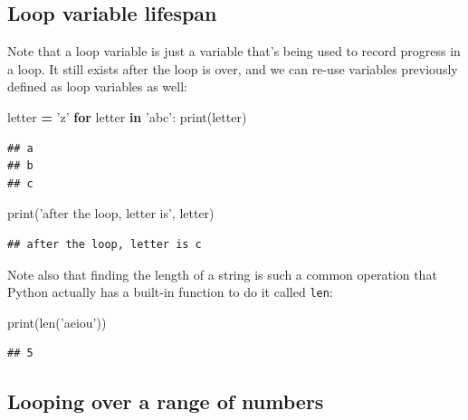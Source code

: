 \documentclass[]{book}
\newenvironment{Shaded}{\begin{snugshade}}{\end{snugshade}}
\newcommand{\BuiltInTok}[1]{#1}
\newcommand{\ControlFlowTok}[1]{\textcolor[rgb]{0.13,0.29,0.53}{\textbf{#1}}}
\newcommand{\KeywordTok}[1]{\textcolor[rgb]{0.13,0.29,0.53}{\textbf{#1}}}
\newcommand{\NormalTok}[1]{#1}
\newcommand{\OperatorTok}[1]{\textcolor[rgb]{0.81,0.36,0.00}{\textbf{#1}}}
\newcommand{\StringTok}[1]{\textcolor[rgb]{0.31,0.60,0.02}{#1}}
\theoremstyle{definition}
\theoremstyle{definition}
\theoremstyle{definition}
\theoremstyle{remark}
\begin{document}
\hypertarget{loop-variable-lifespan}{%
\subsection{Loop variable lifespan}\label{loop-variable-lifespan}}

Note that a loop variable is just a variable that's being used to record
progress in a loop. It still exists after the loop is over, and we can
re-use variables previously defined as loop variables as well:

\begin{Shaded}
\begin{Highlighting}[]
\NormalTok{letter }\OperatorTok{=} \StringTok{'z'}
\ControlFlowTok{for}\NormalTok{ letter }\KeywordTok{in} \StringTok{'abc'}\NormalTok{:}
    \BuiltInTok{print}\NormalTok{(letter)}
\end{Highlighting}
\end{Shaded}

\begin{verbatim}
## a
## b
## c
\end{verbatim}

\begin{Shaded}
\begin{Highlighting}[]
\BuiltInTok{print}\NormalTok{(}\StringTok{'after the loop, letter is'}\NormalTok{, letter)}
\end{Highlighting}
\end{Shaded}

\begin{verbatim}
## after the loop, letter is c
\end{verbatim}

Note also that finding the length of a string is such a common operation
that Python actually has a built-in function to do it called
\texttt{len}:

\begin{Shaded}
\begin{Highlighting}[]
\BuiltInTok{print}\NormalTok{(}\BuiltInTok{len}\NormalTok{(}\StringTok{'aeiou'}\NormalTok{))}
\end{Highlighting}
\end{Shaded}

\begin{verbatim}
## 5
\end{verbatim}

\hypertarget{looping-over-a-range-of-numbers}{%
\subsection{Looping over a range of
numbers}\label{looping-over-a-range-of-numbers}}
\end{document}
